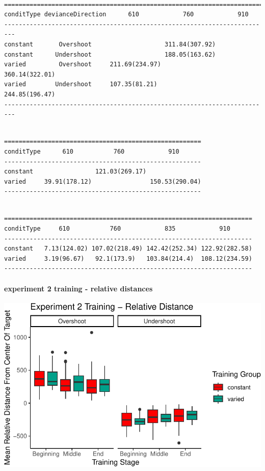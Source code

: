 \documentclass[
  12pt,
  letterpaper,
]{article}
\begin{document}
\begin{verbatim}

=========================================================================
conditType devianceDirection      610            760            910      
-------------------------------------------------------------------------
constant       Overshoot                    311.84(307.92)               
constant      Undershoot                    188.05(163.62)               
varied         Overshoot     211.69(234.97)                360.14(322.01)
varied        Undershoot     107.35(81.21)                 244.85(196.47)
-------------------------------------------------------------------------
\end{verbatim}

\begin{verbatim}

======================================================
conditType      610           760            910      
------------------------------------------------------
constant                 121.03(269.17)               
varied     39.91(178.12)                150.53(290.04)
------------------------------------------------------
\end{verbatim}

\begin{verbatim}

====================================================================
conditType     610           760            835            910      
--------------------------------------------------------------------
constant   7.13(124.02) 107.02(218.49) 142.42(252.34) 122.92(282.58)
varied     3.19(96.67)   92.1(173.9)   103.84(214.4)  108.12(234.59)
--------------------------------------------------------------------
\end{verbatim}

\paragraph{experiment 2 training - relative
distances}\label{experiment-2-training---relative-distances}

\includegraphics{full_files/figure-pdf/unnamed-chunk-64-1.pdf}
\end{document}
